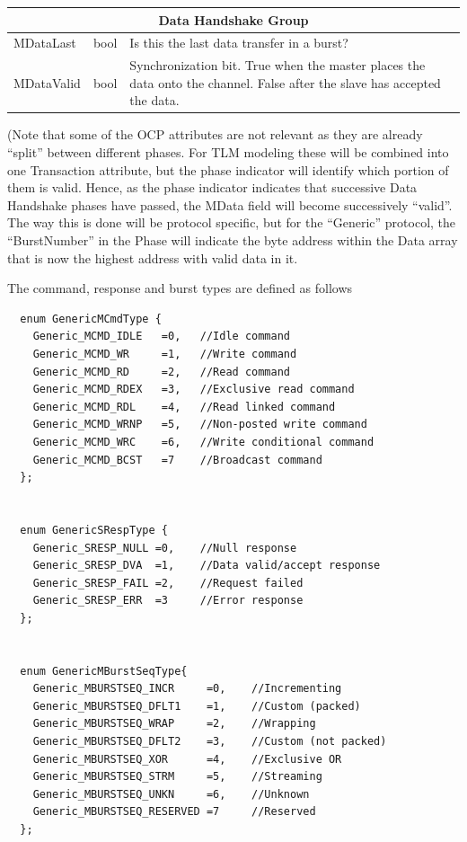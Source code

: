 \documentclass[12pt,oneside]{gsbook}
\begin{document}
\begin{tabular}{l|l|p{6.5cm}}
\multicolumn{3}{c}{Data Handshake Group} \\ \hline

 MDataLast & bool &  Is this the last data transfer in a burst? \\
 MDataValid & bool &  Synchronization bit. True when the master places the data
onto the channel. False after the slave has accepted the data. \\

\end{tabular}

(Note that some of the OCP attributes are not relevant as they are
already ``split'' between different phases. For TLM modeling these will
be combined into one Transaction attribute, but the phase indicator
will identify which portion of them is valid. Hence, as the phase
indicator indicates that successive Data Handshake phases have passed,
the MData field will become successively ``valid''. The way this is
done will be protocol specific, but for the ``Generic'' protocol, the
``BurstNumber'' in the Phase will indicate the byte address within the
Data array that is now the highest address with valid data in it.

The command, response and burst types are defined as follows

\begin{verbatim}
  enum GenericMCmdType {
    Generic_MCMD_IDLE   =0,   //Idle command
    Generic_MCMD_WR     =1,   //Write command
    Generic_MCMD_RD     =2,   //Read command
    Generic_MCMD_RDEX   =3,   //Exclusive read command
    Generic_MCMD_RDL    =4,   //Read linked command
    Generic_MCMD_WRNP   =5,   //Non-posted write command
    Generic_MCMD_WRC    =6,   //Write conditional command
    Generic_MCMD_BCST   =7    //Broadcast command
  };
  
  
  enum GenericSRespType {
    Generic_SRESP_NULL =0,    //Null response
    Generic_SRESP_DVA  =1,    //Data valid/accept response
    Generic_SRESP_FAIL =2,    //Request failed
    Generic_SRESP_ERR  =3     //Error response
  };
  

  enum GenericMBurstSeqType{
    Generic_MBURSTSEQ_INCR     =0,    //Incrementing
    Generic_MBURSTSEQ_DFLT1    =1,    //Custom (packed)
    Generic_MBURSTSEQ_WRAP     =2,    //Wrapping
    Generic_MBURSTSEQ_DFLT2    =3,    //Custom (not packed)
    Generic_MBURSTSEQ_XOR      =4,    //Exclusive OR
    Generic_MBURSTSEQ_STRM     =5,    //Streaming
    Generic_MBURSTSEQ_UNKN     =6,    //Unknown
    Generic_MBURSTSEQ_RESERVED =7     //Reserved
  };

\end{verbatim}
\end{document}
